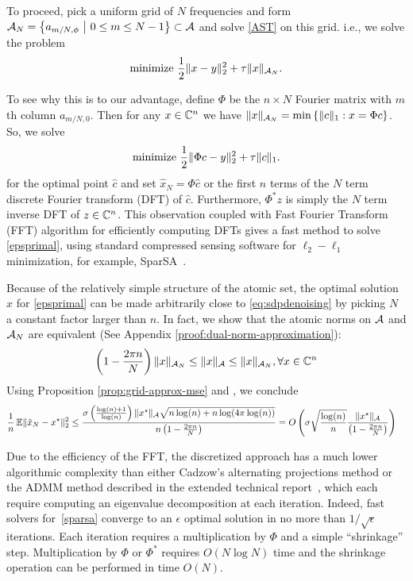 To proceed, pick a uniform grid of $N$ frequencies and form $\mathcal{A}_N = \left\{
a_{m/N,\phi} ~\middle|~ 0 \leq m \leq N-1 \right\} \subset \mathcal{A} $ and solve
\eqref{AST} on this grid. i.e., we solve the problem
\begin{equation}
	\label{epsprimal} \text{minimize }\frac{1}{2} \lVert x - y\rVert_2^2 + \tau \lVert x\rVert_{\mathcal{A}_N}. 
\end{equation}

To see why this is to our advantage, define $\Phi$ be the $n \times N$ Fourier
matrix with $m$th column $a_{m/N,0}$. Then for any $x \in \mathbb{C}^n$ we have $\lVert x\rVert_{\mathcal{A}_N} = \min\left\{ \lVert c\rVert_1: x = \Phi c \right\}$.
So, we solve
\begin{equation}
	\label{sparsa} \text{minimize }\frac{1}{2} \lVert\Phi c- y\rVert_2^2 + \tau \lVert c\rVert_1. 
\end{equation}
for the optimal point $\hat{c}$ and set $\hat{x}_N = \Phi \hat{c}$ or the first
$n$ terms of the $N$ term discrete Fourier transform (DFT) of $\hat{c}$.
Furthermore, $\Phi^* z$ is simply the $N$ term inverse DFT of $z \in \mathbb{C}^n$.
This observation coupled with Fast Fourier Transform (FFT) algorithm for
efficiently computing DFTs gives a fast method to solve \eqref{epsprimal},
using standard compressed sensing software for $\ell_2-\ell_1$ minimization,
for example, SparSA~\cite{wright09}.

Because of the relatively simple structure of the atomic set, the optimal
solution $\hat{x}$ for \eqref{epsprimal} can be made arbitrarily close to
\eqref{eq:sdpdenoising} by picking $N$ a constant factor larger than $n$. In
fact, we show that the atomic norms on $\mathcal{A}$ and $\mathcal{A}_N$ are equivalent (See
Appendix \ref{proof:dual-norm-approximation}):
\begin{equation}
 \left(1-\frac{2\pi n}{N}\right) \lVert x\rVert_{\mathcal{A}_N} \leq  \lVert x\rVert_{\mathcal{A}} \leq \lVert x\rVert_{\mathcal{A}_N}, \forall x \in \mathbb{C}^n
\end{equation}
Using Proposition
\ref{prop:grid-approx-mse} and , we conclude
{\small
\begin{align*}
\frac{1}{n} \operatorname{\mathbb{E}} \lVert\hat{x}_N - x^\star\rVert_2^2 
&\leq
\frac{\sigma\left(\frac{\log(n)+1}{\log(n)}\right)\lVert x^\star\rVert_{\mathcal{A}}
\sqrt{ n \log(n) + 
    n\log(4\pi\log(n))
}}{n\left(1 - \frac{2\pi n}{N}\right)} =
O\left(
\sigma \sqrt{\frac{\log(n)}{n}} \frac{ \lVert x^\star\rVert_{\mathcal{A}}}{\left(1 - \frac{2\pi n}{N}\right)}
\right)
\end{align*}
}

Due to the efficiency of the FFT, the discretized approach
has a much lower algorithmic complexity than either Cadzow's alternating
projections method or the ADMM method described in  the extended technical report~\cite{btr12},
which each require computing an eigenvalue decomposition at
each iteration. Indeed, fast solvers for~\eqref{sparsa} converge to an
$\epsilon$ optimal solution in no more than $1/\sqrt{\epsilon}$ iterations.
Each iteration requires a multiplication by $\Phi$ and a simple ``shrinkage''
step. Multiplication by $\Phi$ or $\Phi^*$ requires $O(N\log N)$ time and the
shrinkage operation can be performed in time $O(N)$.

